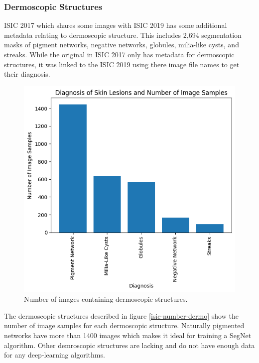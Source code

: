 \subsubsection{Dermoscopic Structures}

ISIC 2017 which shares some images with ISIC 2019 has some additional metadata relating to dermoscopic structure. This includes 2,694 segmentation masks of pigment networks, negative networks, globules, milia-like cysts, and streaks. While the original in ISIC 2017 only has metadata for dermoscopic structures, it was linked to the ISIC 2019 using there image file names to get their diagnosis.

\begin{figure}
	\centering
	\includegraphics[scale=0.8]{images/ISIC/isic-dermo-number.png}
	\caption{Number of images containing dermoscopic structures.} 
\end{figure} \label{isic-number-dermo}

The dermoscopic structures described in figure \ref{isic-number-dermo} show the number of image samples for each dermoscopic structure. Naturally pigmented networks have more than 1400 images which makes it ideal for training a SegNet algorithm. Other demroscopic structures are lacking and do not have enough data for any deep-learning algorithms.

